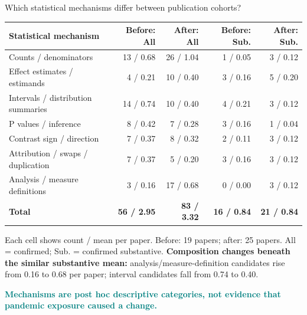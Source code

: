 \documentclass[10pt,aspectratio=169]{beamer}
\newcommand{\smalltext}{\fontsize{8.5}{10.4}\selectfont}
\begin{document}
\begin{frame}[t]{Which statistical mechanisms differ between publication cohorts?}
\small
\begin{tabularx}{\linewidth}{@{}Yrrrr@{}}
\toprule
Statistical mechanism & Before: All & After: All & Before: Sub. & After: Sub. \\
\midrule
Counts / denominators & 13 / 0.68 & 26 / 1.04 & 1 / 0.05 & 3 / 0.12 \\
Effect estimates / estimands & 4 / 0.21 & 10 / 0.40 & 3 / 0.16 & 5 / 0.20 \\
Intervals / distribution summaries & 14 / 0.74 & 10 / 0.40 & 4 / 0.21 & 3 / 0.12 \\
P values / inference & 8 / 0.42 & 7 / 0.28 & 3 / 0.16 & 1 / 0.04 \\
Contrast sign / direction & 7 / 0.37 & 8 / 0.32 & 2 / 0.11 & 3 / 0.12 \\
Attribution / swaps / duplication & 7 / 0.37 & 5 / 0.20 & 3 / 0.16 & 3 / 0.12 \\
Analysis / measure definitions & 3 / 0.16 & 17 / 0.68 & 0 / 0.00 & 3 / 0.12 \\
\midrule
\textbf{Total} & \textbf{56 / 2.95} & \textbf{83 / 3.32} & \textbf{16 / 0.84} & \textbf{21 / 0.84} \\
\bottomrule
\end{tabularx}

\smallskip\par
\smalltext Each cell shows count / mean per paper. Before: 19 papers; after: 25 papers. All = confirmed; Sub. = confirmed substantive.
\medskip
\smalltext
\textbf{Composition changes beneath the similar substantive mean:} analysis/measure-definition candidates rise from 0.16 to 0.68 per paper; interval candidates fall from 0.74 to 0.40.\par\medskip
\textcolor{Teal}{\textbf{Mechanisms are post hoc descriptive categories, not evidence that pandemic exposure caused a change.}}


\end{frame}
\end{document}
